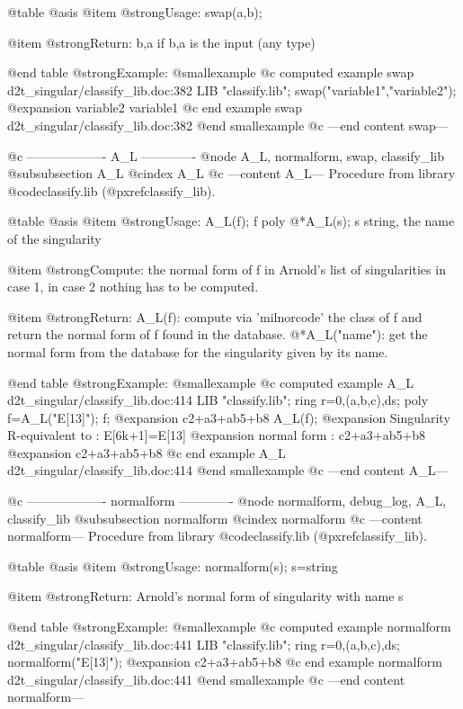 @table @asis
@item @strong{Usage:}
swap(a,b);

@item @strong{Return:}
b,a if b,a is the input (any type)

@end table
@strong{Example:}
@smallexample
@c computed example swap d2t_singular/classify_lib.doc:382 
LIB "classify.lib";
swap("variable1","variable2");
@expansion{} variable2 variable1
@c end example swap d2t_singular/classify_lib.doc:382
@end smallexample
@c ---end content swap---

@c ------------------- A_L -------------
@node A_L, normalform, swap, classify_lib
@subsubsection A_L
@cindex A_L
@c ---content A_L---
Procedure from library @code{classify.lib} (@pxref{classify_lib}).

@table @asis
@item @strong{Usage:}
A_L(f); f poly
@*A_L(s); s string, the name of the singularity

@item @strong{Compute:}
the normal form of f in Arnold's list of singularities in case 1,
in case 2 nothing has to be computed.

@item @strong{Return:}
A_L(f): compute via 'milnorcode' the class of f and return the normal
form of f found in the database.
@*A_L("name"): get the normal form from the database for the
singularity given by its name.

@end table
@strong{Example:}
@smallexample
@c computed example A_L d2t_singular/classify_lib.doc:414 
LIB "classify.lib";
ring r=0,(a,b,c),ds;
poly f=A_L("E[13]");
f;
@expansion{} c2+a3+ab5+b8
A_L(f);
@expansion{} Singularity R-equivalent to :  E[6k+1]=E[13]
@expansion{} normal form : c2+a3+ab5+b8
@expansion{} c2+a3+ab5+b8
@c end example A_L d2t_singular/classify_lib.doc:414
@end smallexample
@c ---end content A_L---

@c ------------------- normalform -------------
@node normalform, debug_log, A_L, classify_lib
@subsubsection normalform
@cindex normalform
@c ---content normalform---
Procedure from library @code{classify.lib} (@pxref{classify_lib}).

@table @asis
@item @strong{Usage:}
normalform(s); s=string

@item @strong{Return:}
Arnold's normal form of singularity with name s

@end table
@strong{Example:}
@smallexample
@c computed example normalform d2t_singular/classify_lib.doc:441 
LIB "classify.lib";
ring r=0,(a,b,c),ds;
normalform("E[13]");
@expansion{} c2+a3+ab5+b8
@c end example normalform d2t_singular/classify_lib.doc:441
@end smallexample
@c ---end content normalform---

